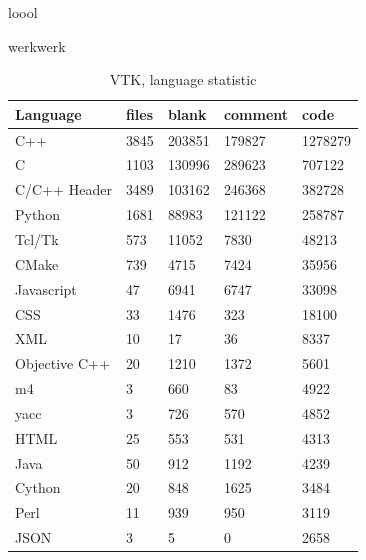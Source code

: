 loool

werkwerk
\begin{table}[h]
	\centering
	\caption{VTK, language statistic}
    \sffamily 
	\begin{tabular}{ l|l|l|l|l }
		\hline
		\textbf{Language}&      \textbf{files}&\textbf{blank}& \textbf{comment}& \textbf{code}\\
		\hline
		C++                                   &3845         &203851         &179827        &1278279\\
		C                                     &1103         &130996         &289623        &707122\\
		C/C++ Header                          &3489         &103162         &246368        & 382728\\
		Python                                &1681         & 88983         &121122        & 258787\\
		Tcl/Tk                                & 573         & 11052         &  7830        &  48213\\
		CMake                                 & 739         &  4715         &  7424        &  35956\\
		Javascript                            &  47         &  6941         &  6747        &  33098\\
		CSS                                   &  33         &  1476         &   323        &  18100\\
		XML                                   &  10         &    17         &    36        &   8337\\
		Objective C++                         &  20         &  1210         &  1372        &   5601\\
		m4                                    &   3         &   660         &    83        &   4922\\
		yacc                                  &   3         &   726         &   570        &   4852\\
		HTML                                  &  25         &   553         &   531        &   4313\\
		Java                                  &  50         &   912         &  1192        &   4239\\
		Cython                                &  20         &   848         &  1625        &   3484\\
		Perl                                  &  11         &   939         &   950        &   3119\\
		JSON                                  &   3         &     5         &     0        &   2658\\

\end{tabular}
\end{table}
